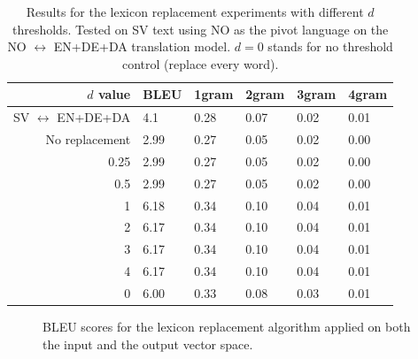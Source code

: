 \documentclass[thesis,fonts=libertine]{cluu}
\begin{document}
\begin{table}
  \centering
  \begin{tabular}{r|*{5}{l}}
    \hline
    \textbf{$d$ value} & \textbf{BLEU} & \textbf{1gram} & \textbf{2gram} & \textbf{3gram} & \textbf{4gram} \\ [0.25ex]
    \hline\hline
    SV $\leftrightarrow$ EN+DE+DA & 4.1 & 0.28 & 0.07 & 0.02 & 0.01 \\
    \hline
    No replacement & 2.99 & 0.27 & 0.05 & 0.02 & 0.00 \\
    0.25 & 2.99 & 0.27 & 0.05 & 0.02 & 0.00 \\
    0.5 & 2.99 & 0.27 & 0.05 & 0.02 & 0.00 \\
    1 & 6.18 & 0.34 & 0.10 & 0.04 & 0.01 \\
    2 & 6.17 & 0.34 & 0.10 & 0.04 & 0.01 \\
    3 & 6.17 & 0.34 & 0.10 & 0.04 & 0.01 \\
    4 & 6.17 & 0.34 & 0.10 & 0.04 & 0.01 \\
    0 & 6.00 & 0.33 & 0.08 & 0.03 & 0.01 \\
    \hline
  \end{tabular}
  \caption{Results for the lexicon replacement experiments with different $d$ thresholds. Tested on SV text using NO as the pivot language on the NO $\leftrightarrow$ EN+DE+DA translation model. $d=0$ stands for no threshold control (replace every word).}
  \label{table:lexicon_replacement}
\end{table}

\begin{figure}
  \centering
  \caption{BLEU scores for the lexicon replacement algorithm applied on both the input and the output vector space.}
  \label{fig:lexicon_replacement}
\end{figure}
\end{document}
